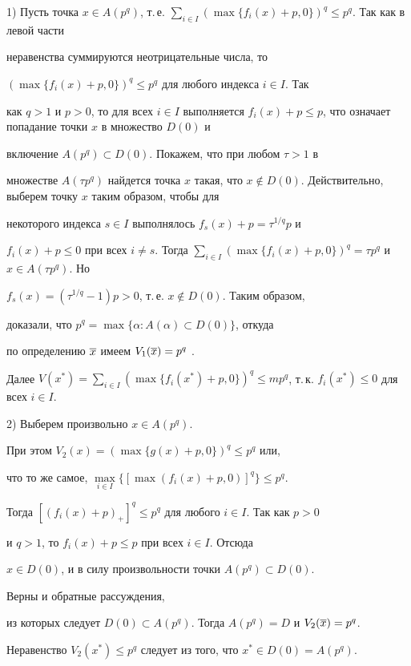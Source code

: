 \begin{pf}


1) Пусть точка $x\in A(p^q)$, т.\,е. $\sum\limits_{i\in


I}(\max\{f_i(x)+p,0\})^q\leq p^q$. Так как в левой части


неравенства суммируются неотрицательные числа, то


$(\max\{f_i(x)+p,0\})^q\leq p^q$ для любого индекса $i\in I$. Так


как $q>1$ и $p>0$, то для всех $i\in I$ выполняется $f_i(x)+p\leq


p$, что означает попадание точки $x$ в множество $D(0)$ и


включение $A(p^q)\subset D(0)$. Покажем, что при любом $\tau>1$ в


множестве $A(\tau p^q)$ найдется точка $x$ такая, что $x\not\in


D(0)$. Действительно, выберем точку $x$ таким образом, чтобы для


некоторого индекса $s\in I$ выполнялось $f_s(x)+p=\tau^{1/q}p$ и


$f_i(x)+p\leq 0$ при всех $i\not =s$. Тогда $\sum\limits_{i\in


I}(\max\{f_i(x)+p,0\})^q=\tau p^q$ и $x\in A(\tau p^q)$. Но


$f_s(x)=(\tau^{1/q}-1)p>0$, т.\,е. $x\notin D(0)$. Таким образом,


доказали, что $p^q=\max\{\alpha: A(\alpha)\subset D(0)\}$, откуда


по определению $\overline x$ имеем $V_1(\overline x)=p^q$ .





Далее $V(x^*)=\sum\limits_{i\in I}(\max\{f_i(x^*)+p,0\})^q \leq


mp^q$, т.\,к. $f_i(x^*)\leq 0$ для всех $i\in I$.





2) Выберем произвольно $x\in A(p^q)$. 


При этом $V_2(x)=(\max\{g(x)+p,0\})^q\leq p^q$ или,


что то же самое, $\max\limits_{i\in I}\{[\max(f_i(x)+p,0)]^q\}\leq p^q$. 


Тогда $[(f_i(x)+p)_+]^q\leq p^q$ для любого $i\in I$. Так как $p>0$


и $q>1$, то $f_i(x)+p\leq p$ при всех $i\in I$. Отсюда


$x\in D(0)$, и в силу произвольности точки $A(p^q)\subset D(0)$.


Верны и обратные рассуждения,


из которых следует $D(0)\subset A(p^q)$. Тогда $A(p^q)=D$ и $V_2(\overline x)=p^q$.





Неравенство $V_2(x^*)\leq p^q$ следует из того, что $x^*\in D(0)=A(p^q)$.


\end{pf}





